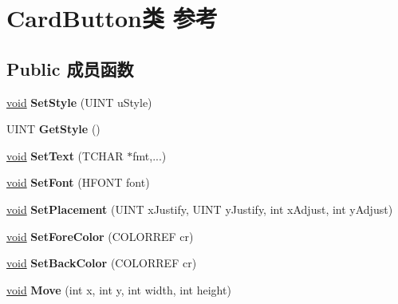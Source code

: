 \hypertarget{class_card_button}{}\section{Card\+Button类 参考}
\label{class_card_button}
\subsection*{Public 成员函数}
\begin{DoxyCompactItemize}
\item 
\mbox{\label{class_card_button_ad05be8b1a642b9bc5c999bc162900df2}} 
\hyperlink{interfacevoid}{void} {\bfseries Set\+Style} (U\+I\+NT u\+Style)
\item 
\mbox{\label{class_card_button_a4f2656e9f21b5a4dd1cb65003e59a25f}} 
U\+I\+NT {\bfseries Get\+Style} ()
\item 
\mbox{\label{class_card_button_a4178836e7453a3f0c026ac636eece6ff}} 
\hyperlink{interfacevoid}{void} {\bfseries Set\+Text} (T\+C\+H\+AR $\ast$fmt,...)
\item 
\mbox{\label{class_card_button_a228d51a287af5bb98d1b01303088ed45}} 
\hyperlink{interfacevoid}{void} {\bfseries Set\+Font} (H\+F\+O\+NT font)
\item 
\mbox{\label{class_card_button_a04d92fa13678f5b4cf8635b5cade8068}} 
\hyperlink{interfacevoid}{void} {\bfseries Set\+Placement} (U\+I\+NT x\+Justify, U\+I\+NT y\+Justify, int x\+Adjust, int y\+Adjust)
\item 
\mbox{\label{class_card_button_a0ca2726a47b1ca225cabb83e259589d1}} 
\hyperlink{interfacevoid}{void} {\bfseries Set\+Fore\+Color} (C\+O\+L\+O\+R\+R\+EF cr)
\item 
\mbox{\label{class_card_button_a7917d9c12db76b624f4a94f706fc3505}} 
\hyperlink{interfacevoid}{void} {\bfseries Set\+Back\+Color} (C\+O\+L\+O\+R\+R\+EF cr)
\item 
\mbox{\label{class_card_button_afb041f1ea408d8467c3c12f66ced031d}} 
\hyperlink{interfacevoid}{void} {\bfseries Move} (int x, int y, int width, int height)

\end{DoxyCompactItemize}
